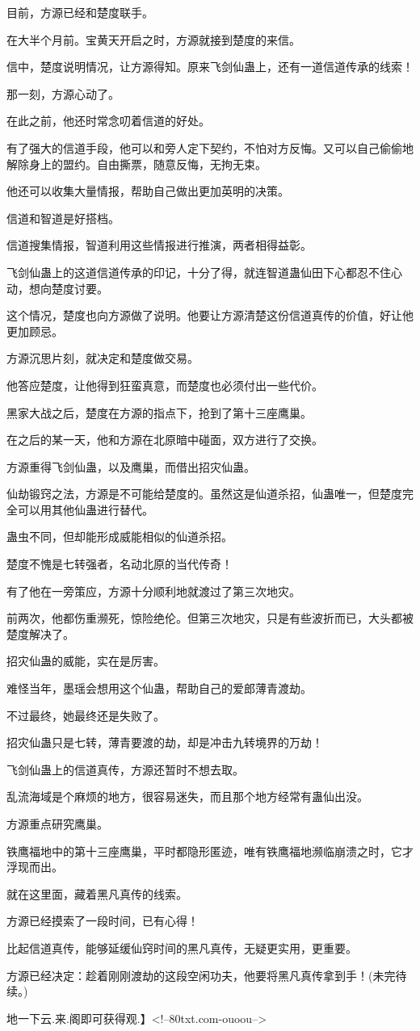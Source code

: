 \begin{this_body}
目前，方源已经和楚度联手。

在大半个月前。宝黄天开启之时，方源就接到楚度的来信。

信中，楚度说明情况，让方源得知。原来飞剑仙蛊上，还有一道信道传承的线索！

那一刻，方源心动了。

在此之前，他还时常念叨着信道的好处。

有了强大的信道手段，他可以和旁人定下契约，不怕对方反悔。又可以自己偷偷地解除身上的盟约。自由撕票，随意反悔，无拘无束。

他还可以收集大量情报，帮助自己做出更加英明的决策。

信道和智道是好搭档。

信道搜集情报，智道利用这些情报进行推演，两者相得益彰。

飞剑仙蛊上的这道信道传承的印记，十分了得，就连智道蛊仙田下心都忍不住心动，想向楚度讨要。

这个情况，楚度也向方源做了说明。他要让方源清楚这份信道真传的价值，好让他更加顾忌。

方源沉思片刻，就决定和楚度做交易。

他答应楚度，让他得到狂蛮真意，而楚度也必须付出一些代价。

黑家大战之后，楚度在方源的指点下，抢到了第十三座鹰巢。

在之后的某一天，他和方源在北原暗中碰面，双方进行了交换。

方源重得飞剑仙蛊，以及鹰巢，而借出招灾仙蛊。

仙劫锻窍之法，方源是不可能给楚度的。虽然这是仙道杀招，仙蛊唯一，但楚度完全可以用其他仙蛊进行替代。

蛊虫不同，但却能形成威能相似的仙道杀招。

楚度不愧是七转强者，名动北原的当代传奇！

有了他在一旁策应，方源十分顺利地就渡过了第三次地灾。

前两次，他都伤重濒死，惊险绝伦。但第三次地灾，只是有些波折而已，大头都被楚度解决了。

招灾仙蛊的威能，实在是厉害。

难怪当年，墨瑶会想用这个仙蛊，帮助自己的爱郎薄青渡劫。

不过最终，她最终还是失败了。

招灾仙蛊只是七转，薄青要渡的劫，却是冲击九转境界的万劫！

飞剑仙蛊上的信道真传，方源还暂时不想去取。

乱流海域是个麻烦的地方，很容易迷失，而且那个地方经常有蛊仙出没。

方源重点研究鹰巢。

铁鹰福地中的第十三座鹰巢，平时都隐形匿迹，唯有铁鹰福地濒临崩溃之时，它才浮现而出。

就在这里面，藏着黑凡真传的线索。

方源已经摸索了一段时间，已有心得！

比起信道真传，能够延缓仙窍时间的黑凡真传，无疑更实用，更重要。

方源已经决定：趁着刚刚渡劫的这段空闲功夫，他要将黑凡真传拿到手！(未完待续。)

地一下云.来.阁即可获得观.】<!--80txt.com-ouoou-->

\end{this_body}

